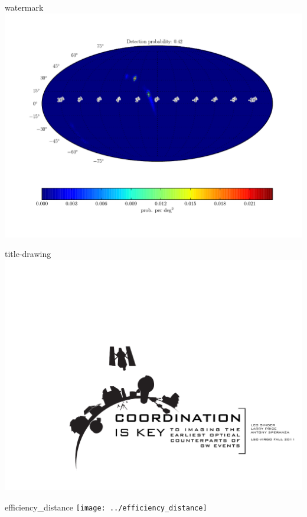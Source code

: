 \documentclass[portrait]{a0poster}
\begin{document}
\begin{staticcontents*}{watermark}
\includegraphics[scale=2]{example-no-interference}
\end{staticcontents*}

\begin{staticcontents*}{title-drawing}
\includegraphics[width=\textwidth,clip=true,trim=0cm 5cm 0cm 0cm]{title-drawing.pdf}
\end{staticcontents*}

\begin{staticcontents*}{efficiency_distance}
\texttt{[image: ../efficiency\_distance]}
\end{staticcontents*}
\end{document}

